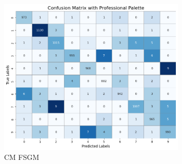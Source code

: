 \documentclass[11pt,onside]{article}
\begin{document}
\begin{algorithm}[H]
\begin{algorithmic}[1]
\end{algorithmic}
\end{algorithm}



\begin{figure}[h]
\centering
\includegraphics[width=0.8\textwidth]{V2_images/model.png}
\caption{CM FSGM }
\label{fig:FSGM}
\end{figure}
\end{document}
